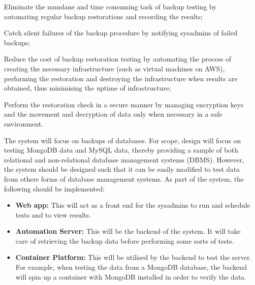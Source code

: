 \begin{AO}
	\item \label{ao1} Eliminate the mundane and time consuming task of backup testing by automating regular backup restorations and recording the results;
	\item \label{ao2} Catch silent failures of the backup procedure by notifying sysadmins of failed backups;
	\item \label{ao3} Reduce the cost of backup restoration testing by automating the process of creating the necessary infrastructure (such as virtual machines on AWS), performing the restoration and destroying the infrastructure when results are obtained, thus minimising the uptime of infrastructure;
	\item \label{ao4} Perform the restoration check in a secure manner by managing encryption keys and the movement and decryption of data only when necessary in a safe environment.
\end{AO}

The system will focus on backups of databases. For scope, design will focus on testing MongoDB data and MySQL data, thereby providing a sample of both relational and non-relational database management systems (DBMS). However, the system should be designed such that it can be easily modified to test data from others forms of database management systems. As part of the system, the following should be implemented:

\begin{itemize}
	\item \textbf{Web app:} This will act as a front end for the sysadmins to run and schedule tests and to view results.
	\item \textbf{Automation Server:} This will be the backend of the system. It will take care of retrieving the backup data before performing some sorts of tests.
	\item \textbf{Container Platform:} This will be utilised by the backend to test the server. For example, when testing the data from a MongoDB database, the backend will spin up a container with MongoDB installed in order to verify the data. 
\end{itemize}
